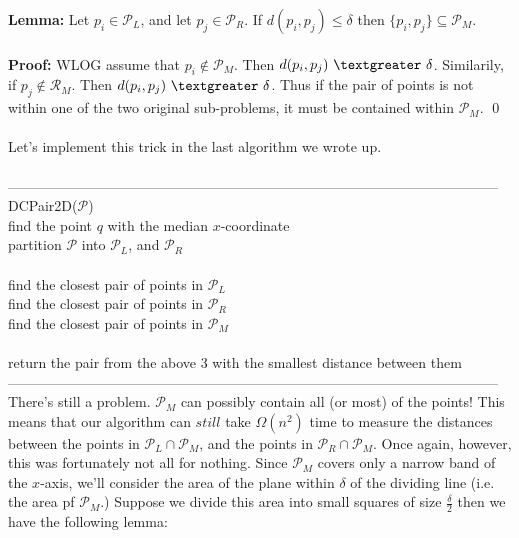 \documentclass{article}
\newcommand{\gt}{\textgreater}
\newcommand{\de}{\delta}
\newcommand{\lem}{\textbf{Lemma: }}
\newcommand{\proo}{\textbf{Proof: }}
\newcommand{\mcal}[1]{\mathcal{#1}}
\begin{document}
\lem Let $p_i \in \mcal{P}_L$, and let $p_j \in \mcal{P}_R$. If $d(p_i, p_j) \leq \de$ then $\{p_i, p_j\} \subseteq \mcal{P}_M$.\\\\
\proo WLOG assume that $p_i \notin \mcal{P}_M$. Then $d(p_i, p_j)\ \gt\ \de$. Similarily, if $p_j \notin \mcal{R}_M$. Then $d(p_i, p_j)\ \gt\ \de$. Thus if the pair of points is not within one of the two original sub-problems, it must be contained within $\mcal{P}_M$.
\qed\\\\
Let's implement this trick in the last algorithm we wrote up.\\\\
---------------------------------------------------------------------------------------------------------
DCPair2D($\mathcal{P}$)\\
	\hspace*{7mm} find the point $q$ with the median $x$-coordinate\\
	\hspace*{7mm} partition $\mcal{P}$ into $\mcal{P}_L$, and $\mcal{P}_R$\\\\
	\hspace*{7mm} find the closest pair of points in $\mcal{P}_L$\\
	\hspace*{7mm} find the closest pair of points in $\mcal{P}_R$\\
	\hspace*{7mm} find the closest pair of points in $\mcal{P}_M$\\\\
	\hspace*{7mm} return the pair from the above 3 with the smallest distance between them\\
---------------------------------------------------------------------------------------------------------\\
There's still a problem. $\mcal{P}_M$ can possibly contain all (or most) of the points! This means that our algorithm can $still$ take $\Omega(n^2)$ time to measure the distances between the points in $\mcal{P}_L \cap \mcal{P}_M$, and the points in $\mcal{P}_R \cap \mcal{P}_M$. Once again, however, this was fortunately not all for nothing. Since $\mcal{P}_M$ covers only a narrow band of the $x$-axis, we'll consider the area of the plane within $\de$ of the dividing line (i.e. the area pf $\mcal{P}_M$.) Suppose we divide this area into small squares of size $\frac{\de}{2}$ then we have the following lemma:\\\\
\end{document}
